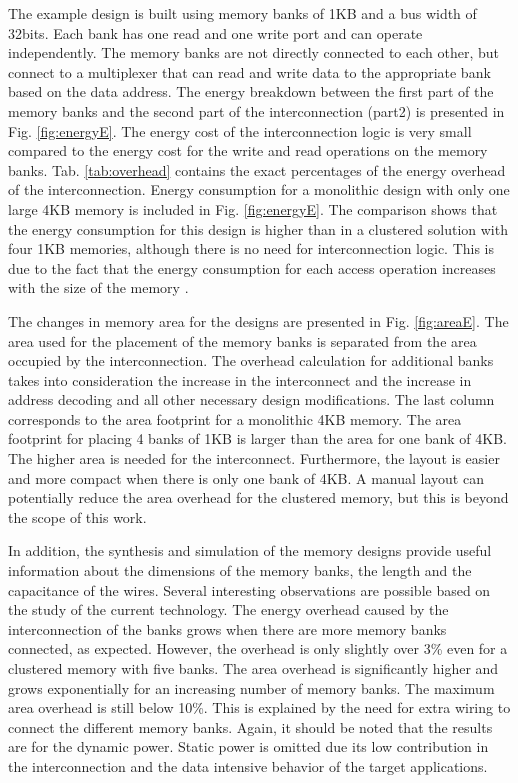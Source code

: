 The example design is built using memory banks of 1KB and a bus width of 32bits.
Each bank has one read and one write port and can operate independently.
The memory banks are not directly connected to each other, but connect to a multiplexer that can read and write data to the appropriate bank based on the data address. 
The energy breakdown between the first part of the memory banks and the second part of the interconnection (part2) is presented in Fig. \ref{fig:energyE}.
The energy cost of the interconnection logic is very small compared to the energy cost for the write and read operations on the memory banks.
Tab. \ref{tab:overhead} contains the exact percentages of the energy overhead of the interconnection. 
Energy consumption for a monolithic design with only one large 4KB memory is included in Fig. \ref{fig:energyE}.
The comparison shows that the energy consumption for this design is higher than in a clustered solution with four 1KB memories, although there is no need for interconnection logic.
This is due to the fact that the energy consumption for each access operation increases with the size of the memory \cite{steinke2002assigning}.
 
The changes in memory area for the designs are presented in Fig. \ref{fig:areaE}.
The area used for the placement of the memory banks is separated from the area occupied by the interconnection.
The overhead calculation for additional banks takes into consideration the increase in the interconnect and the increase in address decoding and all other necessary design modifications.
The last column corresponds to the area footprint for a monolithic 4KB memory.
The area footprint for placing 4 banks of 1KB is larger than the area for one bank of 4KB.
The higher area is needed for the interconnect. Furthermore, the layout is easier and more compact when there is only one bank of 4KB.
A manual layout can potentially reduce the area overhead for the clustered memory, but this is beyond the scope of this work.

In addition, the synthesis and simulation of the memory designs provide useful information about the dimensions of the memory banks, the length and the capacitance of the wires.
Several interesting observations are possible based on the study of the current technology.
The energy overhead caused by the interconnection of the banks grows when there are more memory banks connected, as expected.
However, the overhead is only slightly over 3\% even for a clustered memory with five banks. 
The area overhead is significantly higher and grows exponentially for an increasing number of memory banks.  
The maximum area overhead is still below 10\%.
This is explained by the need for extra wiring to connect the different memory banks.
Again, it should be noted that the results are for the dynamic power. Static power is omitted due its low contribution in the interconnection and the data intensive behavior of the target applications. 

